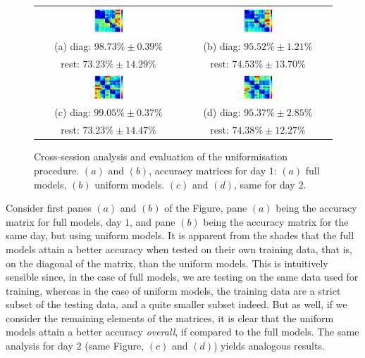 \begin{figure} \centering
  \begin{tabular}{cc}
    \includegraphics[width=0.22\textwidth]{figs/fig_resCross1_full} &
    \includegraphics[width=0.22\textwidth]{figs/fig_resCross1} \\
    (a) diag: $98.73\% \pm 0.39\%$  & (b) diag: $95.52\% \pm 1.21\%$ \\
        rest: $73.23\% \pm 14.29\%$ & rest: $74.53\% \pm 13.70\%$ \\
    \includegraphics[width=0.22\textwidth]{figs/fig_resCross2_full} &
    \includegraphics[width=0.22\textwidth]{figs/fig_resCross2} \\
    (c) diag: $99.05\% \pm 0.37\%$ & (d) diag: $95.37\% \pm 2.85\%$ \\
        rest: $73.23\% \pm 14.47\%$ & rest: $74.38\% \pm 12.27\%$ \\
  \end{tabular}
  \caption{Cross-session analysis and evaluation of the uniformisation
    procedure. $(a)$ and $(b)$, accuracy matrices for day $1$: $(a)$
    full models, $(b)$ uniform models. $(c)$ and $(d)$, same for day $2$.}
  \label{fig:cross_initial}
\end{figure}

Consider first panes $(a)$ and $(b)$ of the Figure, pane $(a)$
being the accuracy matrix for full models, day $1$, and pane $(b)$
being the accuracy matrix for the same day, but using uniform
models. It is apparent from the shades that the full models attain
a better accuracy when tested on their own training data, that is,
on the diagonal of the matrix, than the uniform models.  This is
intuitively sensible since, in the case of full models, we are
testing on the same data used for training, whereas in the case of
uniform models, the training data are a strict subset of the
testing data, and a quite smaller subset indeed. But as well, if
we consider the remaining elements of the matrices, it is clear
that the uniform models attain a better accuracy \emph{overall},
if compared to the full models. The same analysis for day $2$
(same Figure, $(c)$ and $(d)$) yields analogous results.

